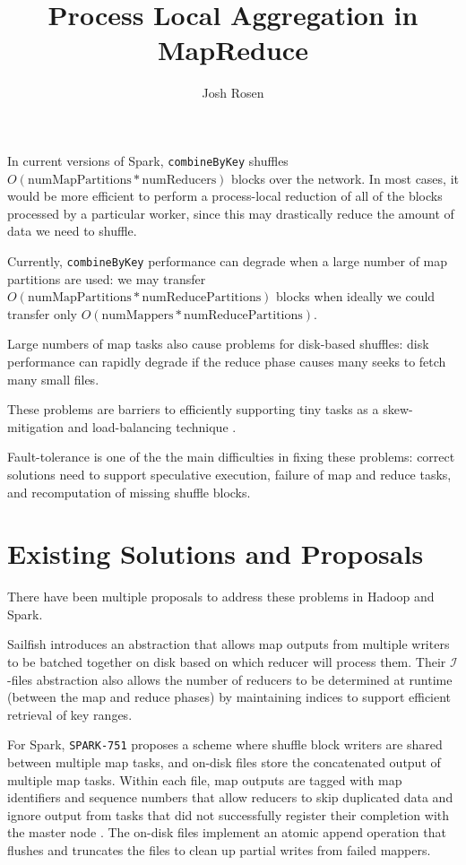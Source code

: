 \documentclass[12pt]{article}
\title{Process Local Aggregation in MapReduce}
\author{Josh Rosen}
\begin{document}
\maketitle

In current versions of Spark, \texttt{combineByKey} shuffles
$O(\text{numMapPartitions} * \text{numReducers})$ blocks over the network.  In
most cases, it would be more efficient to perform a process-local reduction of
all of the blocks processed by a particular worker, since this may
drastically reduce the amount of data we need to shuffle.

Currently, \texttt{combineByKey} performance can degrade when a large number of
map partitions are used: we may transfer $O(\text{numMapPartitions}
* \text{numReducePartitions})$ blocks when ideally we could transfer only
$O(\text{numMappers} * \text{numReducePartitions})$.

Large numbers of map tasks also cause problems for disk-based shuffles: disk
performance can rapidly degrade if the reduce phase causes many seeks to fetch
many small files.

These problems are barriers to efficiently supporting tiny tasks as
a skew-mitigation and load-balancing technique \cite{tinytasks}.

Fault-tolerance is one of the the main difficulties in fixing these problems:
correct solutions need to support speculative execution, failure of map and
reduce tasks, and recomputation of missing shuffle blocks.

\section{Existing Solutions and Proposals}

There have been multiple proposals to address these problems in Hadoop and Spark.

Sailfish \cite{sailfish} introduces an
abstraction that allows map outputs from multiple writers to be batched
together on disk based on which reducer will process them.  Their
$\mathcal{I}$-files abstraction also allows the number of reducers to be
determined at runtime (between the map and reduce phases) by maintaining
indices to support efficient retrieval of key ranges.

For Spark, \texttt{SPARK-751} \cite{SPARK-751} proposes a scheme where shuffle block
writers are shared between multiple map tasks, and on-disk files store the
concatenated output of multiple map tasks.  Within each file, map outputs are
tagged with map identifiers and sequence numbers that allow reducers to skip
duplicated data and ignore output from tasks that did not successfully
register their completion with the master node .  The on-disk files implement
an atomic append operation that flushes and truncates the files to clean up
partial writes from failed mappers.
\end{document}

